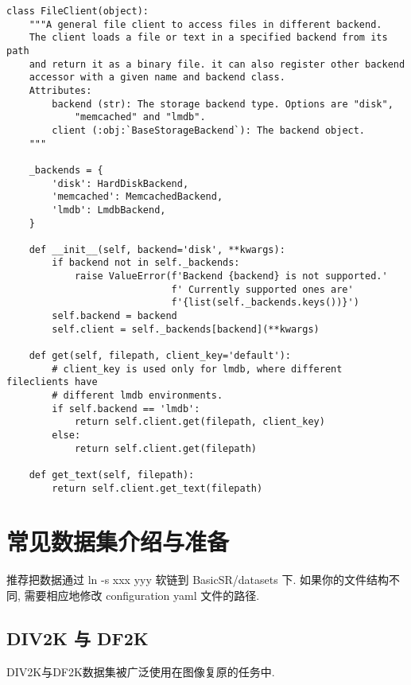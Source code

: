 \documentclass[../main.tex]{subfiles}
\begin{document}
\begin{verbatim}
class FileClient(object):
    """A general file client to access files in different backend.
    The client loads a file or text in a specified backend from its path
    and return it as a binary file. it can also register other backend
    accessor with a given name and backend class.
    Attributes:
        backend (str): The storage backend type. Options are "disk",
            "memcached" and "lmdb".
        client (:obj:`BaseStorageBackend`): The backend object.
    """

    _backends = {
        'disk': HardDiskBackend,
        'memcached': MemcachedBackend,
        'lmdb': LmdbBackend,
    }

    def __init__(self, backend='disk', **kwargs):
        if backend not in self._backends:
            raise ValueError(f'Backend {backend} is not supported.'
                             f' Currently supported ones are'
                             f'{list(self._backends.keys())}')
        self.backend = backend
        self.client = self._backends[backend](**kwargs)

    def get(self, filepath, client_key='default'):
        # client_key is used only for lmdb, where different fileclients have
        # different lmdb environments.
        if self.backend == 'lmdb':
            return self.client.get(filepath, client_key)
        else:
            return self.client.get(filepath)

    def get_text(self, filepath):
        return self.client.get_text(filepath)
\end{verbatim}


\section{常见数据集介绍与准备}\label{data_preparation:dataset}

推荐把数据通过 ln -s xxx yyy 软链到 BasicSR/datasets 下. 如果你的文件结构不同, 需要相应地修改 configuration yaml 文件的路径.

\subsection{DIV2K 与 DF2K}

DIV2K与DF2K数据集被广泛使用在图像复原的任务中.
\end{document}
